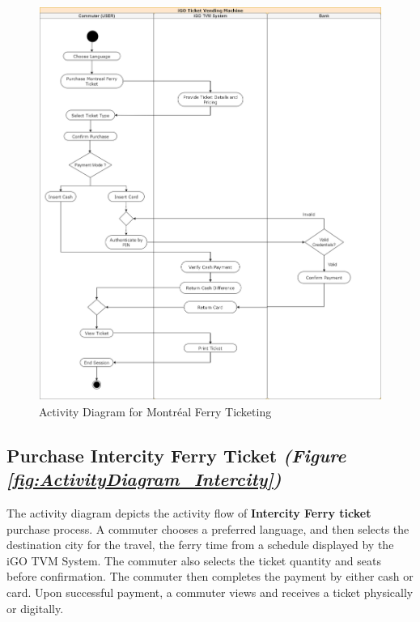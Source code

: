 \documentclass[letterpaper]{report}
\begin{document}
\begin{figure}[ht]
    \centering
    \includegraphics[width=\textwidth, height=0.73\textheight, keepaspectratio]{ActivityDiagrams/AD - 1.png}
    \caption{Activity Diagram for Montréal Ferry Ticketing}
    \label{fig:ActivityDiagram_Montreal}
\end{figure}
\clearpage

 \subsection{Purchase Intercity Ferry Ticket \emph{(Figure \ref{fig:ActivityDiagram_Intercity})}}
The activity diagram depicts the activity flow of {\bf Intercity Ferry ticket} purchase process. A commuter chooses a preferred language, and then selects the destination city for the travel, the ferry time from a schedule displayed by the iGO TVM System. The commuter also selects the ticket quantity and seats before confirmation. The commuter then completes the payment by either cash or card. Upon successful payment, a commuter views and receives a ticket physically or digitally.
\end{document}

